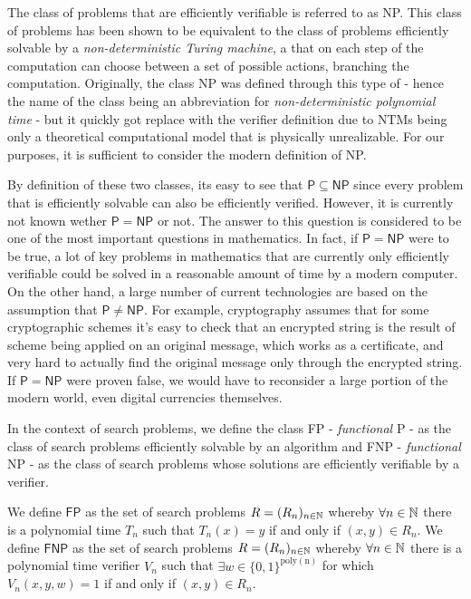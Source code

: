 The class of problems that are efficiently verifiable is referred to as \textsf{NP}. This class of problems has been shown to be equivalent to the class of problems efficiently solvable by a \textit{non-deterministic Turing machine}, a \TM that on each step of the computation can choose between a set of possible actions, branching the computation. Originally, the class \textsf{NP} was defined through this type of \TM - hence the name of the class being an abbreviation for \textit{non-deterministic polynomial time} - but it quickly got replace with the verifier definition due to \textsf{NTM}s being only a theoretical computational model that is physically unrealizable. For our purposes, it is sufficient to consider the modern definition of \textsf{NP}.

By definition of these two classes, its easy to see that $\mathsf{P} \subseteq \mathsf{NP}$ since every problem that is efficiently solvable can also be efficiently verified. However, it is currently not known wether $\mathsf{P} = \mathsf{NP}$ or not. The answer to this question is considered to be one of the most important questions in mathematics. In fact, if $\mathsf{P} = \mathsf{NP}$ were to be true, a lot of key problems in mathematics that are currently only efficiently verifiable could be solved in a reasonable amount of time by a modern computer. On the other hand, a large number of current technologies are based on the assumption that $\mathsf{P} \neq \mathsf{NP}$. For example, cryptography assumes that for some cryptographic schemes it's easy to check that an encrypted string is the result of scheme being applied on an original message, which works as a certificate, and very hard to actually find the original message only through the encrypted string. If $\mathsf{P} = \mathsf{NP}$ were proven false, we would have to reconsider a large portion of the modern world, even digital currencies themselves.

In the context of search problems, we define the class \textsf{FP} - \textit{functional} \textsf{P} - as the class of search problems efficiently solvable by an algorithm and \textsf{FNP} - \textit{functional} \textsf{NP} - as the class of search problems whose solutions are efficiently verifiable by a verifier. 

\newpage

\begin{definition}
    We define $\mathsf{FP}$ as the set of search problems $R = (R_n)_{n \in \mathbb{N}}$ whereby $\forall n \in \mathbb{N}$ there is a polynomial time \TM $T_n$ such that $T_n(x) = y$ if and only if $(x,y) \in R_n$. We define $\mathsf{FNP}$ as the set of search problems $R = (R_n)_{n \in \mathbb{N}}$ whereby $\forall n \in \mathbb{N}$ there is a polynomial time verifier $V_n$ such that $\exists w \in \{0,1\}^{\mathrm{poly(n)}}$ for which $V_n(x,y,w) = 1$ if and only if $(x,y) \in R_n$. 
\end{definition}

